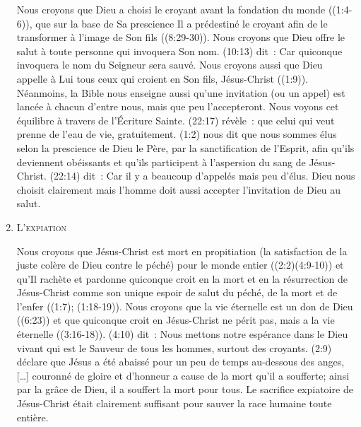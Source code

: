 \begin{enumerate}
\nobreak
\begin{specialpar}{}
Nous croyons que Dieu a choisi le croyant avant la fondation du mon\-de
 ((1:4-6)), que sur la base de Sa prescience 
 Il a prédestiné \pocketlinebreak
 le croyant afin de le transformer à l'image de Son fils
 (\BRallowhypbch{}(8:29-30)\BRforbidhypbch).
 Nous croyons que Dieu offre le salut à toute personne qui invoquera Son nom.
 (10:13) dit~: \og Car quiconque invoquera le nom du Seigneur sera sauvé. \fg{}
 Nous croyons aussi que Dieu appelle à Lui tous ceux qui croient en Son fils,
 Jésus-Christ ((1:9)).
Néanmoins, la Bible nous enseigne aussi qu'une invitation (ou un appel)
 est lancée à chacun d'entre nous, mais que peu l'accepteront.
 Nous voyons cet équilibre à travers de l'Écriture Sainte.
 (22:17) révèle~:
 \og [\dots{}] que  celui qui veut prenne de l'eau de vie, gratuitement. \fg{}
 (1:2) nous dit que nous sommes \og élus selon la prescience de Dieu le Père,
 par la sanctification de l'Esprit, afin qu'ils deviennent obéissants et qu'ils participent
 à l'aspersion du sang de Jésus-Christ. \fg{}
 (22:14) dit~: \og Car il y a beaucoup d'appelés mais peu d'élus. \fg{}
 Dieu nous choisit clairement mais l'homme doit aussi accepter l'invitation de Dieu au salut.
\end{specialpar}


  \item  \textsc{L'expiation}

\nobreak
Nous croyons que Jésus-Christ est mort en propitiation
 (la satisfaction de la juste colère de Dieu contre le péché)
 \og pour le monde entier \fg{} ((2:2)\BRchsep{}(4:9-10))
 et qu'Il rachète et pardonne quiconque croit en la mort et en la résurrection
 de Jésus-Christ comme son unique espoir de salut du péché, 
 de la mort et de l'en\-fer ((1:7); (1:18-19)).
 Nous croyons que la vie éternelle est un don de Dieu ((6:23))
 et que \og quiconque croit \fg{} en Jésus-Christ ne périt pas,
 mais a la vie éternelle ((3:16-18)).
 (4:10) dit~:
 \og Nous mettons notre espérance dans le Dieu vivant qui est le Sauveur de tous les hommes,
 surtout des croyants. \fg{}
 (2:9) déclare que Jésus \og a été abaissé pour un peu de temps au-dessous des anges,
 [\dots{}] couronné de gloire et d'honneur a cause de la mort qu'il a soufferte;
 ainsi par la grâce de Dieu, il a souffert la mort pour tous. \fg{}
 Le sacrifice expiatoire de Jésus-Christ était clairement suffisant pour sauver
 la race humaine toute entière.



\end{enumerate}
